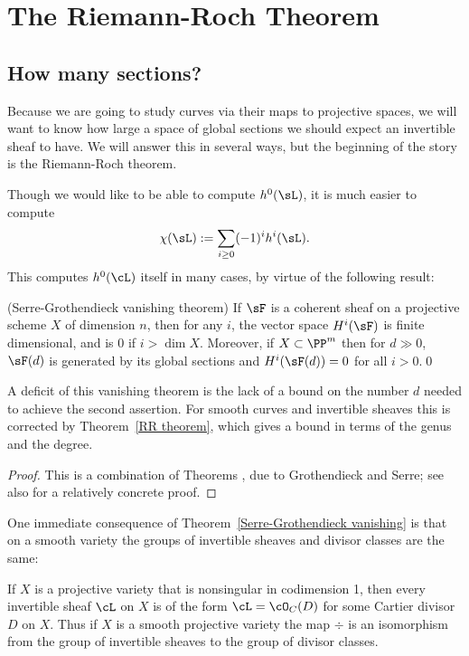 

\chapter{The Riemann-Roch Theorem}\label{RiemannRochChapter}

\section{How many sections?}

Because we are going to study curves via their maps to projective spaces, we will want to know how large a space of global
sections we should expect an invertible sheaf to have. We will answer this in several ways, but the beginning
of the story is the Riemann-Roch theorem.

Though we would like to be able to compute  $h^0(\sL)$, it is much easier to compute
$$
\chi(\sL):= \sum_{i\geq 0} (-1)^i h^i(\sL).
$$
This computes $h^0(\cL)$ itself in many cases, by virtue of the following result:

\begin{theorem} (Serre-Grothendieck vanishing theorem)\label{Serre-Grothendieck vanishing}
If $\sF$ is a coherent sheaf on a projective scheme $X$ of dimension $n$, then for any $i$, the vector space $H^i(\sF)$ is finite dimensional, and is 0 if  $i>\dim X$. Moreover,
if $X\subset \PP^m$ then for $d\gg 0$, $\sF(d)$ is generated by its global sections and $H^i(\sF(d)) = 0$ for all $i>0$.\qed
\end{theorem}

A deficit of this vanishing theorem is the lack of a bound on the number $d$ needed to achieve the second assertion. For smooth curves
and invertible sheaves
this is corrected by Theorem~\ref{RR theorem}, which gives a bound in terms of the genus and the degree.

\begin{proof}
This is a combination of Theorems \cite[Theorems III.2.7 and III.5.2]{Hartshorne1977}, due to Grothendieck and Serre; see also \cite{Serre1955} for a relatively concrete proof.
\end{proof}

One immediate consequence of Theorem~\ref{Serre-Grothendieck vanishing} is that on a smooth variety the groups of invertible sheaves and divisor classes are the same:

\begin{corollary}\label{invertible sheaves and divisors}
If $X$ is a projective variety that is nonsingular in codimension 1, then every invertible sheaf $\cL$ on $X$ is of the form $\cL = \cO_C(D)$ for some Cartier divisor $D$ on $X$. Thus if $X$ is a smooth projective variety the map $\div$ is an isomorphism from the group of invertible sheaves to the group
of divisor classes.
\end{corollary}

